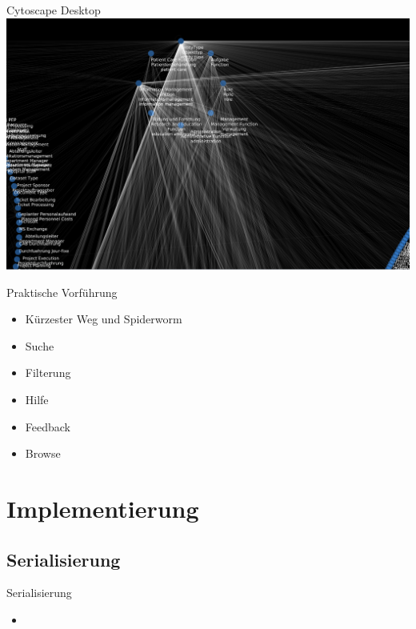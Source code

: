 \documentclass[14pt,aspectratio=1610]{beamer}
\begin{document}
\begin{frame}{Cytoscape Desktop}
\centering\includegraphics[width=\textwidth,height=\textheight,keepaspectratio]{img/types_classrelations_zoomed.png}
\end{frame}


\begin{frame}{Praktische Vorführung}
\begin{itemize}
\item Kürzester Weg und Spiderworm
\item Suche
\item Filterung
\item Hilfe
\item Feedback
\item Browse
\end{itemize}
\end{frame}

\section{Implementierung}%

\subsection{Serialisierung}%

\begin{frame}{Serialisierung}
\begin{block}{}
\begin{itemize}
\item 
\end{itemize}
\end{block}
\end{frame}
\end{document}
